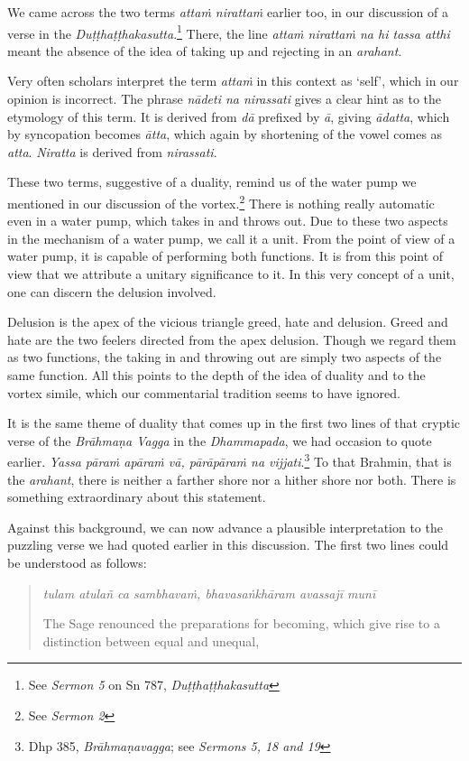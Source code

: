 We came across the two terms \emph{attaṁ nirattaṁ} earlier too, in our discussion of a verse in the \emph{Duṭṭhaṭṭhakasutta}.\footnote{See \emph{Sermon 5} on Sn 787, \emph{Duṭṭhaṭṭhakasutta}} There, the line \emph{attaṁ nirattaṁ na hi tassa atthi} meant the absence of the idea of taking up and rejecting in an \emph{arahant}.

Very often scholars interpret the term \emph{attaṁ} in this context as `self', which in our opinion is incorrect. The phrase \emph{nādeti na nirassati} gives a clear hint as to the etymology of this term. It is derived from \emph{dā} prefixed by \emph{ā}, giving \emph{ādatta}, which by syncopation becomes \emph{ātta}, which again by shortening of the vowel comes as \emph{atta}. \emph{Niratta} is derived from \emph{nirassati}.

These two terms, suggestive of a duality, remind us of the water pump we mentioned in our discussion of the vortex.\footnote{See \emph{Sermon 2}} There is nothing really automatic even in a water pump, which takes in and throws out. Due to these two aspects in the mechanism of a water pump, we call it a unit. From the point of view of a water pump, it is capable of performing both functions. It is from this point of view that we attribute a unitary significance to it. In this very concept of a unit, one can discern the delusion involved.

Delusion is the apex of the vicious triangle greed, hate and delusion. Greed and hate are the two feelers directed from the apex delusion. Though we regard them as two functions, the taking in and throwing out are simply two aspects of the same function. All this points to the depth of the idea of duality and to the vortex simile, which our commentarial tradition seems to have ignored.

It is the same theme of duality that comes up in the first two lines of that cryptic verse of the \emph{Brāhmaṇa Vagga} in the \emph{Dhammapada}, we had occasion to quote earlier. \emph{Yassa pāraṁ apāraṁ vā, pārāpāraṁ na vijjati}.\footnote{Dhp 385, \emph{Brāhmaṇavagga}; see \emph{Sermons 5, 18 and 19}} To that Brahmin, that is the \emph{arahant}, there is neither a farther shore nor a hither shore nor both. There is something extraordinary about this statement.

Against this background, we can now advance a plausible interpretation to the puzzling verse we had quoted earlier in this discussion. The first two lines could be understood as follows:

\begin{quote}
\emph{tulam atulañ ca sambhavaṁ, bhavasaṅkhāram avassajī munī}

The Sage renounced the preparations for becoming, which give rise to a distinction between equal and unequal,
\end{quote}


